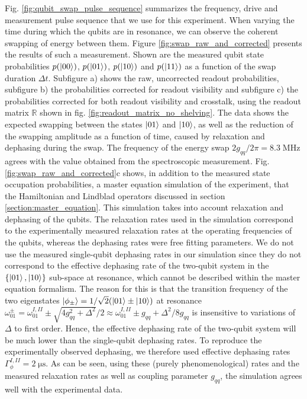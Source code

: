 Fig. \ref{fig:qubit_swap_pulse_sequence} summarizes the frequency, drive and measurement pulse sequence that we use for this experiment. When varying the time during which the qubits are in resonance, we can observe the coherent swapping of energy between them. Figure \ref{fig:swap_raw_and_corrected} presents the results of such a measurement. Shown are the measured qubit state probabilities $p(\left| 00 \right>)$, $p(\left| 01 \right>)$, $p(\left| 10 \right>)$ and $p(\left| 11 \right>)$ as a function of the swap duration $\Delta t$. Subfigure a) shows the raw, uncorrected readout probabilities, subfigure b) the probabilities corrected for readout visibility and subfigure c) the probabilities corrected for both readout visibility and crosstalk, using the readout matrix $\mathbb{R}$ shown in fig. \ref{fig:readout_matrix_no_shelving}. The data shows the expected swapping between the states $\left| 01 \right>$ and $\left| 10 \right>$, as well as the reduction of the swapping amplitude as a function of time, caused by relaxation and dephasing during the swap. The frequency of the energy swap $2g_{qq}/2\pi = 8.3\;\mathrm{MHz}$ agrees with the value obtained from the spectroscopic measurement. Fig. \ref{fig:swap_raw_and_corrected}c shows, in addition to the measured state occupation probabilities, a master equation simulation of the experiment, that the Hamiltonian and Lindblad operators discussed in section \ref{section:master_equation}. This simulation takes into account relaxation and dephasing of the qubits. The relaxation rates used in the simulation correspond to the experimentally measured relaxation rates at the operating frequencies of the qubits, whereas the dephasing rates were free fitting parameters. We do not use the measured single-qubit dephasing rates in our simulation since they do not correspond to the effective dephasing rate of the two-qubit system in the $\{\left| 01 \right>,\left| 10 \right>\}$ sub-space at resonance, which cannot be described within the master equation formalism. The reason for this is that the transition frequency of the two eigenstates $\left| \phi_\pm \right>=1/\sqrt{2}(\left| 01 \right>\pm\left| 10 \right>)$ at resonance $\omega_{01}^{\pm}=\omega_{01}^{I,II}\pm\sqrt{4g_{qq}^2+\Delta^2}/2\approx \omega_{01}^{I,II}\pm g_{qq} +\Delta^2/8g_{qq}$ is insensitive to variations of $\Delta$ to first order. Hence, the effective dephasing rate of the two-qubit system will be much lower than the single-qubit dephasing rates. To reproduce the experimentally observed dephasing, we therefore used effective dephasing rates $\Gamma_\phi^{I,II}=2\;\mathrm{\mu s}$. As can be seen, using these (purely phenomenological) rates and the measured relaxation rates as well as coupling parameter $g_{qq}$, the simulation agrees well with the experimental data.


